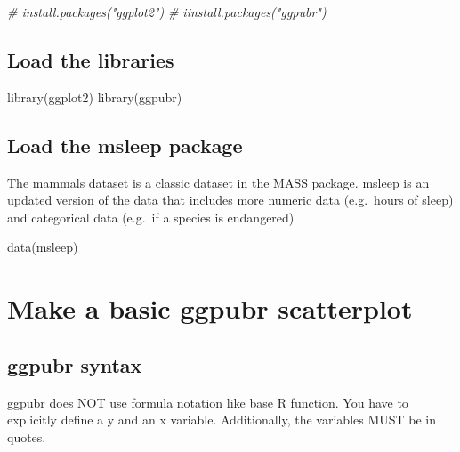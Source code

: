 \documentclass[
]{book}
\newenvironment{Shaded}{\begin{snugshade}}{\end{snugshade}}
\newcommand{\CommentTok}[1]{\textcolor[rgb]{0.56,0.35,0.01}{\textit{#1}}}
\newcommand{\FunctionTok}[1]{\textcolor[rgb]{0.00,0.00,0.00}{#1}}
\newcommand{\NormalTok}[1]{#1}
\begin{document}
\begin{Shaded}
\begin{Highlighting}[]
\CommentTok{\# install.packages("ggplot2")}
\CommentTok{\# iinstall.packages("ggpubr")}
\end{Highlighting}
\end{Shaded}

\hypertarget{load-the-libraries-1}{%
\subsection{Load the libraries}\label{load-the-libraries-1}}

\begin{Shaded}
\begin{Highlighting}[]
\FunctionTok{library}\NormalTok{(ggplot2)}
\FunctionTok{library}\NormalTok{(ggpubr)}
\end{Highlighting}
\end{Shaded}

\hypertarget{load-the-msleep-package-1}{%
\subsection{Load the msleep package}\label{load-the-msleep-package-1}}

The mammals dataset is a classic dataset in the MASS package. msleep is an updated version of the data that includes more numeric data (e.g.~hours of sleep) and categorical data (e.g.~if a species is endangered)

\begin{Shaded}
\begin{Highlighting}[]
\FunctionTok{data}\NormalTok{(msleep)}
\end{Highlighting}
\end{Shaded}

\hypertarget{make-a-basic-ggpubr-scatterplot}{%
\section{Make a basic ggpubr scatterplot}\label{make-a-basic-ggpubr-scatterplot}}

\hypertarget{ggpubr-syntax-1}{%
\subsection{ggpubr syntax}\label{ggpubr-syntax-1}}

ggpubr does NOT use formula notation like base R function. You have to explicitly define a y and an x variable. Additionally, the variables MUST be in quotes.
\end{document}
